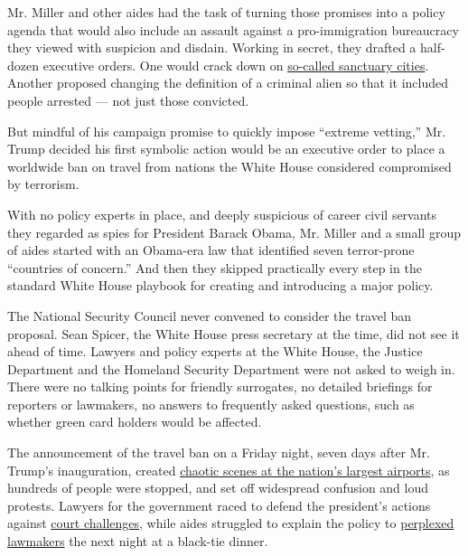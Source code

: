 Mr. Miller and other aides had the task of turning those promises into a
policy agenda that would also include an assault against a
pro-immigration bureaucracy they viewed with suspicion and disdain.
Working in secret, they drafted a half-dozen executive orders. One would
crack down on
\href{https://www.nytimes3xbfgragh.onion/interactive/2016/09/02/us/sanctuary-cities.html}{so-called
sanctuary cities}. Another proposed changing the definition of a
criminal alien so that it included people arrested --- not just those
convicted.

But mindful of his campaign promise to quickly impose ``extreme
vetting,'' Mr. Trump decided his first symbolic action would be an
executive order to place a worldwide ban on travel from nations the
White House considered compromised by terrorism.

With no policy experts in place, and deeply suspicious of career civil
servants they regarded as spies for President Barack Obama, Mr. Miller
and a small group of aides started with an Obama-era law that identified
seven terror-prone ``countries of concern.'' And then they skipped
practically every step in the standard White House playbook for creating
and introducing a major policy.

The National Security Council never convened to consider the travel ban
proposal. Sean Spicer, the White House press secretary at the time, did
not see it ahead of time. Lawyers and policy experts at the White House,
the Justice Department and the Homeland Security Department were not
asked to weigh in. There were no talking points for friendly surrogates,
no detailed briefings for reporters or lawmakers, no answers to
frequently asked questions, such as whether green card holders would be
affected.

The announcement of the travel ban on a Friday night, seven days after
Mr. Trump's inauguration, created
\href{https://www.nytimes3xbfgragh.onion/2017/01/29/us/politics/white-house-official-in-reversal-says-green-card-holders-wont-be-barred.html}{chaotic
scenes at the nation's largest airports}, as hundreds of people were
stopped, and set off widespread confusion and loud protests. Lawyers for
the government raced to defend the president's actions against
\href{https://www.nytimes3xbfgragh.onion/2017/01/29/us/politics/trump-immigration-refugee-order.html}{court
challenges}, while aides struggled to explain the policy to
\href{https://www.nytimes3xbfgragh.onion/2017/01/29/us/politics/republicans-congress-trump-refugees.html}{perplexed
lawmakers} the next night at a black-tie dinner.

